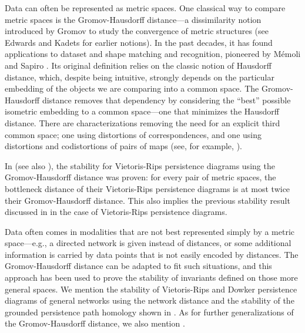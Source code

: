 \documentclass[8pt,a4paper,oneside,english,english]{article}
\theoremstyle{plain}
\theoremstyle
{plain}
\theoremstyle{definition}
\begin{document}
Data can often be represented as metric spaces. One classical way to compare metric spaces is the Gromov-Hausdorff distance---a dissimilarity notion introduced
by Gromov \cite{gromov:81} to study the convergence of metric structures (see Edwards \cite{edwards:75} and Kadets \cite{kadets:75} for earlier notions). In the past decades, it has found applications to dataset and shape matching and recognition, pioneered by M\'emoli and Sapiro \cite{MemSap}.
Its original definition relies on the classic notion of Hausdorff distance, which, despite being intuitive, strongly depends on the particular embedding of the objects we are comparing into a common space. 
The Gromov-Hausdorff distance removes that dependency by considering the ``best'' possible isometric embedding to a common space---one that minimizes the Hausdorff distance. 
There are characterizations removing the need for an explicit third common space; one using distortions of correspondences, and one using distortions and codistortions of pairs of maps (see, for example, \cite{BurBurIva,KalOst,Tuz}).  


In \cite{ChaCoh-SteGuiMemOud} (see  
also \cite{ChaDeSOud}), the stability for Vietoris-Rips persistence diagrams using the Gromov-Hausdorff distance was proven: 
for every pair of metric spaces, 
the bottleneck distance of their Vietoris-Rips persistence diagrams is at most twice their Gromov-Hausdorff distance. 
This also implies the previous stability result discussed in \cite{Coh-SteEdeHar} in the case of Vietoris-Rips persistence diagrams.

Data often comes in modalities that are not best represented simply by a metric space---e.g., a directed network is given instead of distances, or some additional information is carried by data points that is not easily encoded by distances. The Gromov-Hausdorff distance can be adapted to fit such situations, and this approach has been used to prove the stability of invariants defined on those more general spaces.
We mention the stability of Vietoris-Rips and Dowker persistence diagrams of general networks using the network distance \cite{ChoMem3} and the stability of the grounded persistence path homology shown in \cite{ChaHarTil}. As for further generalizations of the Gromov-Hausdorff distance, we also mention \cite{directed,Khe,Zav_q}.
\end{document}
